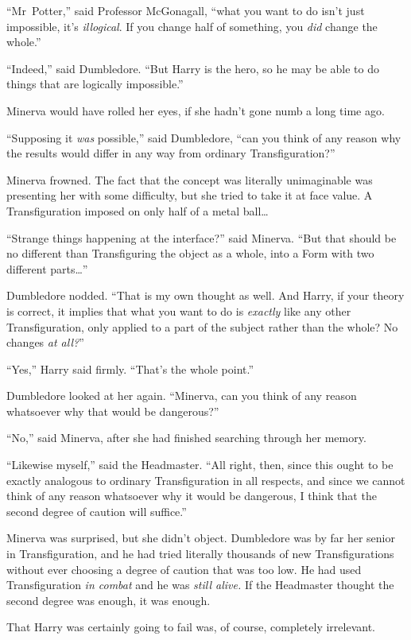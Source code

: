 “Mr~Potter,” said Professor McGonagall, “what you want to do isn’t just impossible, it’s \emph{illogical}. If you change half of something, you \emph{did} change the whole.”

“Indeed,” said Dumbledore. “But Harry is the hero, so he may be able to do things that are logically impossible.”

Minerva would have rolled her eyes, if she hadn’t gone numb a long time ago.

“Supposing it \emph{was} possible,” said Dumbledore, “can you think of any reason why the results would differ in any way from ordinary Transfiguration?”

Minerva frowned. The fact that the concept was literally unimaginable was presenting her with some difficulty, but she tried to take it at face value. A Transfiguration imposed on only half of a metal ball…

“Strange things happening at the interface?” said Minerva. “But that should be no different than Transfiguring the object as a whole, into a Form with two different parts…”

Dumbledore nodded. “That is my own thought as well. And Harry, if your theory is correct, it implies that what you want to do is \emph{exactly} like any other Transfiguration, only applied to a part of the subject rather than the whole? No changes \emph{at all?}”

“Yes,” Harry said firmly. “That’s the whole point.”

Dumbledore looked at her again. “Minerva, can you think of any reason whatsoever why that would be dangerous?”

“No,” said Minerva, after she had finished searching through her memory.

“Likewise myself,” said the Headmaster. “All right, then, since this ought to be exactly analogous to ordinary Transfiguration in all respects, and since we cannot think of any reason whatsoever why it would be dangerous, I think that the second degree of caution will suffice.”

Minerva was surprised, but she didn’t object. Dumbledore was by far her senior in Transfiguration, and he had tried literally thousands of new Transfigurations without ever choosing a degree of caution that was too low. He had used Transfiguration \emph{in combat} and he was \emph{still alive.} If the Headmaster thought the second degree was enough, it was enough.

That Harry was certainly going to fail was, of course, completely irrelevant.

